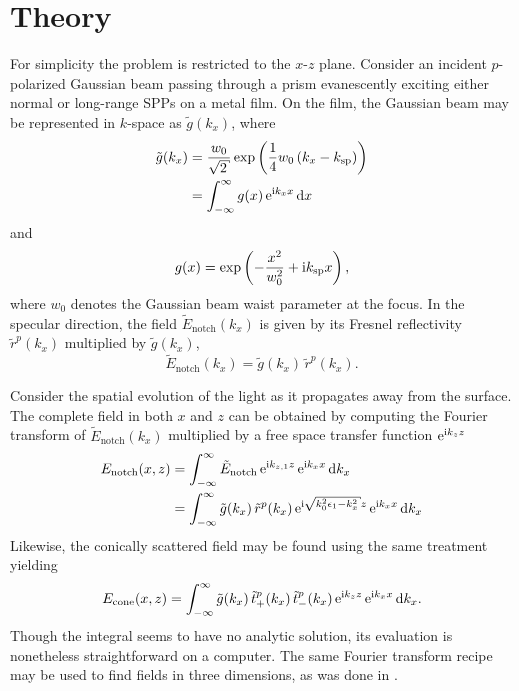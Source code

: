 \section{Theory}\label{sec:interferencetheory}
For simplicity the problem is restricted to the $x$-$z$ plane.  Consider an
incident $p$-polarized Gaussian beam passing through a prism evanescently
exciting either normal or long-range SPPs on a metal film.  On the film,
the Gaussian beam may be represented in $k$-space as $\tilde{g}(k_x)$,
where
\begin{align}
\tilde{g}(k_x) &= \frac{w_0}{\sqrt{2}} \exp\left(\frac{1}{4}w_0\left(k_x - \ksp\right)\right)\\
&= \intinfty g(x)\, \me^{\mi k_x x} \md x
\end{align}
and
\begin{equation}
g(x) = \exp\left(-\frac{x^2}{w_0^2} + {\mathrm{i}} k_\mathrm{sp} x\right),
\end{equation}
where $w_0$ denotes the Gaussian beam waist parameter at the focus.  In the
specular direction, the field $\tilde{E}_\mathrm{notch}(k_x)$ is given by its
Fresnel reflectivity $\tilde{r}^p(k_x)$ multiplied by $\tilde{g}(k_x)$,
\begin{equation}
\tilde{E}_\mathrm{notch}(k_x)=\tilde{g}(k_x)\,\tilde{r}^p(k_x).
\end{equation}

Consider the spatial evolution of the light as it propagates
away from the surface.
The complete field in both $x$ and $z$ can be obtained by computing
the Fourier transform of $\tilde{E}_\mathrm{notch}(k_x)$ multiplied
by a free space transfer function ${\mathrm{e}}^{{\mathrm{i}} k_{z} z}$
\begin{align}
E_\mathrm{notch}(x,z) &= \intinfty \tilde{E}_\mathrm{notch}\, \me^{\mi k_{z,1} z}\, \me^{\mi k_x x} \md k_x\\
 &= \intinfty \tilde{g}(k_x)\, \tilde{r}^p(k_x)\, \me^{\mi \sqrt{k_0^2 \epsilon_1 - k_x^2}z}\, \me^{\mi k_x x} \md k_x
\label{eqn:fourier123}
\end{align}
Likewise, the conically scattered field may be found using the same
treatment yielding
\begin{align}
E_\text{cone}(x,z) = \int_{-\infty}^{\infty} \tilde{g}(k_x)\,
\tilde{t}^p_+(k_x)\, \tilde{t}^p_-(k_x)\,{\mathrm{e}}^{{\mathrm{i}} k_z z}\, {\mathrm{e}}^{{\mathrm{i}} k_x x}
\,\mathrm{d} k_x.
\label{eqn:fourier321}
\end{align}
Though the integral seems to have no analytic solution, its evaluation is
nonetheless straightforward on a computer.  The same Fourier transform
recipe may be used to find fields in three dimensions, as was done in
.

